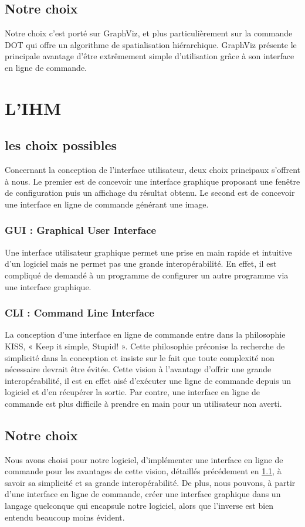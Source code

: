 				
  \subsection{Notre choix}
		Notre choix c'est porté sur GraphViz, et plus particulièrement sur la commande \og DOT \fg{} qui offre un algorithme de spatialisation hiérarchique. GraphViz présente le principale avantage d'être extrêmement simple d'utilisation grâce à son interface en ligne de commande.

\section{L'IHM}	
	\subsection{les choix possibles}
	\label{ihm_choix_possibles}
		Concernant la conception de l'interface utilisateur, deux choix principaux s'offrent à nous. Le premier est de concevoir
une interface graphique proposant une fenêtre de configuration puis un affichage du résultat obtenu. Le second est de concevoir 	une interface en ligne de commande générant une image. 	
	
		\subsubsection{GUI : \og Graphical User Interface \fg{}}
			Une interface utilisateur graphique permet une prise en main rapide et intuitive d'un logiciel mais ne permet pas une grande interopérabilité. En effet, il est compliqué de demandé à un programme de configurer un autre programme via une interface graphique.
			
		\subsubsection{CLI : \og Command Line Interface \fg{}}
			La conception d'une interface en ligne de commande entre dans la philosophie KISS, « Keep it simple, Stupid! ». Cette philosophie préconise la recherche de simplicité dans la conception et insiste sur le fait que toute complexité non nécessaire devrait être évitée. Cette vision à l'avantage d'offrir une grande interopérabilité, il est en effet aisé d'exécuter une ligne de commande depuis un logiciel et d'en récupérer la sortie. Par contre, une interface en ligne de commande est plus difficile à prendre en main pour un utilisateur non averti.  
			
	\subsection{Notre choix}
		Nous avons choisi pour notre logiciel, d'implémenter une interface en ligne de commande pour les avantages de cette vision, détaillés précédement en \ref{ihm_choix_possibles}, à savoir sa simplicité et sa grande interopérabilité. De plus, nous pouvons, à partir d'une interface en ligne de commande, créer une interface graphique dans un langage quelconque qui encapsule notre logiciel, alors que l'inverse est bien entendu beaucoup moins évident.

